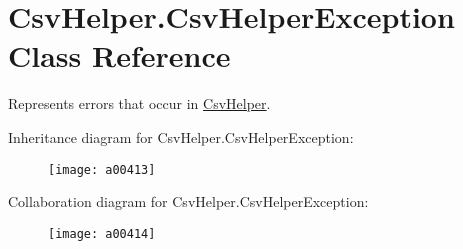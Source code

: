 \hypertarget{a00060}{\section{Csv\-Helper.\-Csv\-Helper\-Exception Class Reference}
\label{a00060}
}


Represents errors that occur in \hyperlink{a00325}{Csv\-Helper}.  




Inheritance diagram for Csv\-Helper.\-Csv\-Helper\-Exception\-:
\nopagebreak
\begin{figure}[H]
\begin{center}
\leavevmode
\texttt{[image: a00413]}
\end{center}
\end{figure}


Collaboration diagram for Csv\-Helper.\-Csv\-Helper\-Exception\-:
\nopagebreak
\begin{figure}[H]
\begin{center}
\leavevmode
\texttt{[image: a00414]}
\end{center}
\end{figure}
